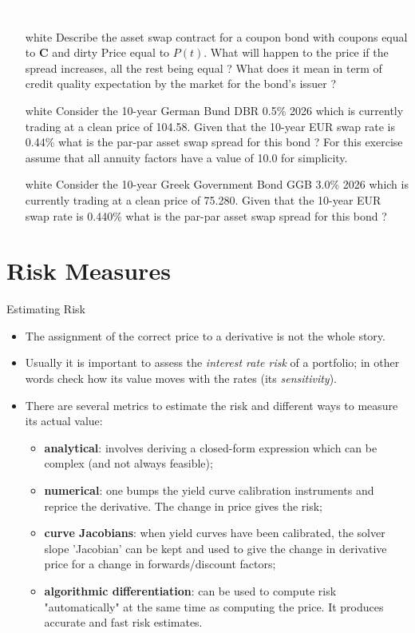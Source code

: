 \documentclass{beamer}
\begin{document}
\begin{homework}
\begin{frame}{\textcolor{white}{Homework}}
\begin{itemize}
\item[white] Describe the asset swap contract for a coupon bond with coupons equal to \textbf{C} and dirty Price equal to $P(t)$. What will happen to the price if the spread increases, all the rest being equal ? What does it mean in term of credit quality expectation by the market for the bond's issuer ?
\item[white]  Consider the 10-year German Bund DBR 0.5\% 2026 which is currently trading at a clean price of 104.58. 
Given that the 10-year EUR swap rate is 0.44\% what is the par-par asset swap spread for this bond ? 
For this exercise assume that all annuity factors have a value of 10.0 for simplicity.
\item[white] Consider the 10-year Greek Government Bond GGB 3.0\% 2026 which is currently trading at a clean price of 75.280. Given that the 10-year EUR swap rate is 0.440\% what is the par-par asset swap spread for this bond ?
\end{itemize}
\end{frame}
\end{homework}

\section{Risk Measures}
\begin{frame}{Estimating Risk}
\begin{itemize}
\item The assignment of the correct price to a derivative is not the whole story.
\item Usually it is important to assess the \emph{interest rate risk} of a portfolio; in other words check how its value moves with the rates (its \emph{sensitivity}).
\item There are several metrics to estimate the risk and different ways to measure its actual value:
\begin{itemize}
	\item \textbf{analytical}: involves deriving a closed-form expression which can be complex (and not always feasible);
	\item \textbf{numerical}: one bumps the yield curve calibration instruments and reprice the derivative. The change in price gives the risk;
	\item \textbf{curve Jacobians}: when yield curves have been calibrated, the solver slope 'Jacobian' can be kept and used to give the change in derivative price for a change in forwards/discount factors;
	\item \textbf{algorithmic differentiation}: can be used to compute risk "automatically" at the same time as computing the price. It produces accurate and fast risk estimates.
\end{itemize}
\end{itemize}
\end{frame}
\end{document}
